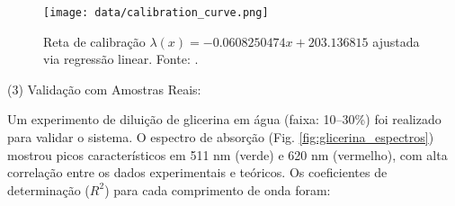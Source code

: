 \documentclass[a4paper]{ifacconf}
\begin{document}
\begin{figure}[ht]
    \centering
    \texttt{[image: data/calibration\_curve.png]}
    \caption{Reta de calibração $\lambda(x) = -0.0608250474x + 203.136815$ ajustada via regressão linear. Fonte: \cite{autoria_propria}.}
    \label{fig:calib_curve}
\end{figure}





(3) Validação com Amostras Reais:
\label{subsec:validacao}

Um experimento de diluição de glicerina em água (faixa: 10–30\%) foi realizado para validar o sistema. O espectro de absorção (Fig. \ref{fig:glicerina_espectros}) mostrou picos característicos em 511 nm (verde) e 620 nm (vermelho), com alta correlação entre os dados experimentais e teóricos. Os coeficientes de determinação (\(R^2\)) para cada comprimento de onda foram:
\end{document}
